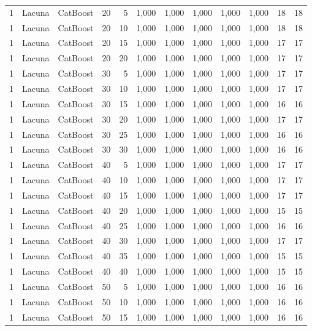\begin{longtable}{@{}rllrrrrrrrrr@{}}
1 & Lacuna & CatBoost & 20 & 5 & 1,000 & 1,000 & 1,000 & 1,000 & 1,000 & 18 & 18 \\
1 & Lacuna & CatBoost & 20 & 10 & 1,000 & 1,000 & 1,000 & 1,000 & 1,000 & 18 & 18 \\
1 & Lacuna & CatBoost & 20 & 15 & 1,000 & 1,000 & 1,000 & 1,000 & 1,000 & 17 & 17 \\
1 & Lacuna & CatBoost & 20 & 20 & 1,000 & 1,000 & 1,000 & 1,000 & 1,000 & 17 & 17 \\
1 & Lacuna & CatBoost & 30 & 5 & 1,000 & 1,000 & 1,000 & 1,000 & 1,000 & 17 & 17 \\
1 & Lacuna & CatBoost & 30 & 10 & 1,000 & 1,000 & 1,000 & 1,000 & 1,000 & 17 & 17 \\
1 & Lacuna & CatBoost & 30 & 15 & 1,000 & 1,000 & 1,000 & 1,000 & 1,000 & 16 & 16 \\
1 & Lacuna & CatBoost & 30 & 20 & 1,000 & 1,000 & 1,000 & 1,000 & 1,000 & 17 & 17 \\
1 & Lacuna & CatBoost & 30 & 25 & 1,000 & 1,000 & 1,000 & 1,000 & 1,000 & 16 & 16 \\
1 & Lacuna & CatBoost & 30 & 30 & 1,000 & 1,000 & 1,000 & 1,000 & 1,000 & 16 & 16 \\
1 & Lacuna & CatBoost & 40 & 5 & 1,000 & 1,000 & 1,000 & 1,000 & 1,000 & 17 & 17 \\
1 & Lacuna & CatBoost & 40 & 10 & 1,000 & 1,000 & 1,000 & 1,000 & 1,000 & 17 & 17 \\
1 & Lacuna & CatBoost & 40 & 15 & 1,000 & 1,000 & 1,000 & 1,000 & 1,000 & 17 & 17 \\
1 & Lacuna & CatBoost & 40 & 20 & 1,000 & 1,000 & 1,000 & 1,000 & 1,000 & 15 & 15 \\
1 & Lacuna & CatBoost & 40 & 25 & 1,000 & 1,000 & 1,000 & 1,000 & 1,000 & 16 & 16 \\
1 & Lacuna & CatBoost & 40 & 30 & 1,000 & 1,000 & 1,000 & 1,000 & 1,000 & 17 & 17 \\
1 & Lacuna & CatBoost & 40 & 35 & 1,000 & 1,000 & 1,000 & 1,000 & 1,000 & 15 & 15 \\
1 & Lacuna & CatBoost & 40 & 40 & 1,000 & 1,000 & 1,000 & 1,000 & 1,000 & 15 & 15 \\
1 & Lacuna & CatBoost & 50 & 5 & 1,000 & 1,000 & 1,000 & 1,000 & 1,000 & 16 & 16 \\
1 & Lacuna & CatBoost & 50 & 10 & 1,000 & 1,000 & 1,000 & 1,000 & 1,000 & 16 & 16 \\
1 & Lacuna & CatBoost & 50 & 15 & 1,000 & 1,000 & 1,000 & 1,000 & 1,000 & 16 & 16 \\

\end{longtable}
